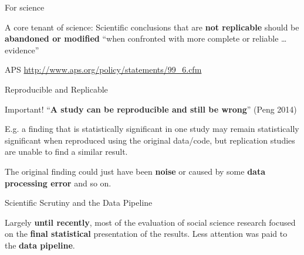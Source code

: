 \documentclass[10pt]{beamer}
\begin{document}
\begin{frame}{For science}

    A \alert{core tenant} of science: Scientific conclusions that are \textbf{not replicable} should be \textbf{abandoned or modified} ``when confronted with more complete or reliable \ldots evidence''

{\tiny{APS \url{http://www.aps.org/policy/statements/99_6.cfm}}}

\end{frame}

\begin{frame}{Reproducible and Replicable}

    \begin{alertblock}{Important!}
        ``\textbf{A study can be reproducible and still be wrong}'' (Peng 2014)

        \vspace{0.5cm}

        E.g. a finding that is statistically significant in one study may remain statistically significant when reproduced using the original data/code, but replication studies are unable to find a similar result.

        \vspace{0.5cm}

        The original finding could just have been \textbf{noise} or caused by some \textbf{data processing error} and so on.
    \end{alertblock}

\end{frame}

\begin{frame}{Scientific Scrutiny and the Data Pipeline}

        Largely \textbf{until recently}, most of the evaluation of social science research focused on the \textbf{final statistical} presentation of the results. Less attention was paid to the \textbf{data pipeline}.

\end{frame}
\end{document}
